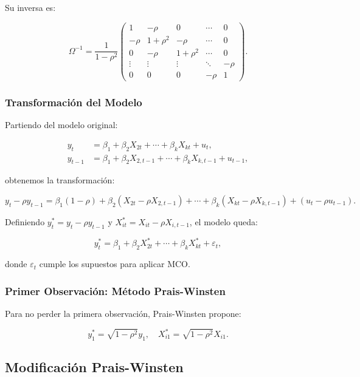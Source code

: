 \documentclass[a4paper,12pt]{article}
\begin{document}
Su inversa es:

\[
\Omega^{-1} = \frac{1}{1 - \rho^2}
\begin{pmatrix}
1 & -\rho & 0 & \cdots & 0 \\
-\rho & 1 + \rho^2 & -\rho & \cdots & 0 \\
0 & -\rho & 1 + \rho^2 & \cdots & 0 \\
\vdots & \vdots & \vdots & \ddots & -\rho \\
0 & 0 & 0 & -\rho & 1
\end{pmatrix}.
\]

\subsubsection{Transformación del Modelo}

Partiendo del modelo original:

\[
\begin{aligned}
    y_t &= \beta_1 + \beta_2 X_{2t} + \cdots + \beta_k X_{kt} + u_t, \\
    y_{t-1} &= \beta_1 + \beta_2 X_{2,t-1} + \cdots + \beta_k X_{k,t-1} + u_{t-1},
\end{aligned}
\]

obtenemos la transformación:

\[
y_t - \rho y_{t-1} = \beta_1 (1 - \rho) + \beta_2 (X_{2t} - \rho X_{2,t-1}) + \cdots + \beta_k (X_{kt} - \rho X_{k,t-1}) + (u_t - \rho u_{t-1}).
\]

Definiendo $y_t^* = y_t - \rho y_{t-1}$ y $X_{it}^* = X_{it} - \rho X_{i,t-1}$, el modelo queda:

\[
y_t^* = \beta_1 + \beta_2 X_{2t}^* + \cdots + \beta_k X_{kt}^* + \varepsilon_t,
\]

donde $\varepsilon_t$ cumple los supuestos para aplicar MCO. 

\subsubsection{Primer Observación: Método Prais-Winsten}

Para no perder la primera observación, Prais-Winsten propone:

\[
y_1^* = \sqrt{1 - \rho^2} y_1, \quad X_{i1}^* = \sqrt{1 - \rho^2} X_{i1}.
\]

\subsection{Modificación Prais-Winsten}
\end{document}
